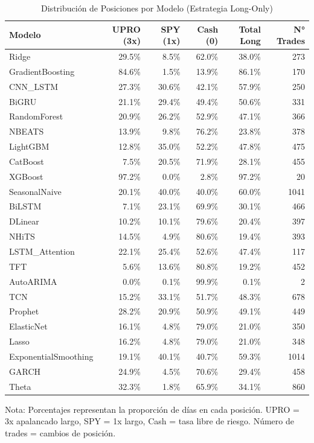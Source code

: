 \begin{table}[htbp]
\centering
\caption{Distribuci\'on de Posiciones por Modelo (Estrategia Long-Only)}
\label{tab:position_distribution}
\small
\begin{tabular}{@{}lrrrrr@{}}
\toprule
\textbf{Modelo} & \textbf{UPRO (3x)} & \textbf{SPY (1x)} & \textbf{Cash (0)} & \textbf{Total Long} & \textbf{N° Trades} \\
\midrule
Ridge & 29.5\% & 8.5\% & 62.0\% & 38.0\% & 273 \\
GradientBoosting & 84.6\% & 1.5\% & 13.9\% & 86.1\% & 170 \\
CNN\_LSTM & 27.3\% & 30.6\% & 42.1\% & 57.9\% & 250 \\
BiGRU & 21.1\% & 29.4\% & 49.4\% & 50.6\% & 331 \\
RandomForest & 20.9\% & 26.2\% & 52.9\% & 47.1\% & 366 \\
NBEATS & 13.9\% & 9.8\% & 76.2\% & 23.8\% & 378 \\
LightGBM & 12.8\% & 35.0\% & 52.2\% & 47.8\% & 475 \\
CatBoost & 7.5\% & 20.5\% & 71.9\% & 28.1\% & 455 \\
XGBoost & 97.2\% & 0.0\% & 2.8\% & 97.2\% & 20 \\
SeasonalNaive & 20.1\% & 40.0\% & 40.0\% & 60.0\% & 1041 \\
BiLSTM & 7.1\% & 23.1\% & 69.9\% & 30.1\% & 466 \\
DLinear & 10.2\% & 10.1\% & 79.6\% & 20.4\% & 397 \\
NHiTS & 14.5\% & 4.9\% & 80.6\% & 19.4\% & 393 \\
LSTM\_Attention & 22.1\% & 25.4\% & 52.6\% & 47.4\% & 117 \\
TFT & 5.6\% & 13.6\% & 80.8\% & 19.2\% & 452 \\
AutoARIMA & 0.0\% & 0.1\% & 99.9\% & 0.1\% & 2 \\
TCN & 15.2\% & 33.1\% & 51.7\% & 48.3\% & 678 \\
Prophet & 28.2\% & 20.9\% & 50.9\% & 49.1\% & 449 \\
ElasticNet & 16.1\% & 4.8\% & 79.0\% & 21.0\% & 350 \\
Lasso & 16.2\% & 4.8\% & 79.0\% & 21.0\% & 348 \\
ExponentialSmoothing & 19.1\% & 40.1\% & 40.7\% & 59.3\% & 1014 \\
GARCH & 24.9\% & 4.5\% & 70.6\% & 29.4\% & 458 \\
Theta & 32.3\% & 1.8\% & 65.9\% & 34.1\% & 860 \\
\bottomrule
\end{tabular}
\begin{tablenotes}
\small
\item Nota: Porcentajes representan la proporci\'on de d\'ias en cada posici\'on. UPRO = 3x apalancado largo, SPY = 1x largo, Cash = tasa libre de riesgo. N\'umero de trades = cambios de posici\'on.
\end{tablenotes}
\end{table}
